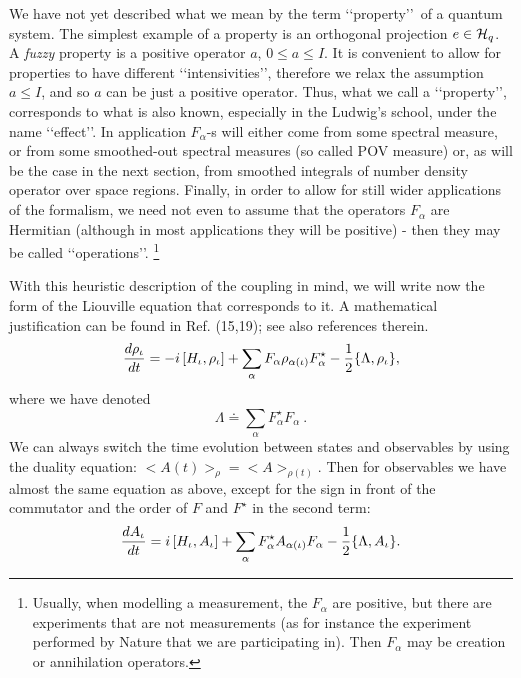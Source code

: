 \documentclass[12pt]{article}
\def\hq{{\cal H}_q}
\def\be{\begin{equation}}
\def\ee{\end{equation}}
\def\lqq{\lq\lq}
\def\rqq{\rq\rq}
\begin{document}
We have not yet described what we mean by the term \lqq property\rqq\,  of a
quantum system. The simplest example of a property is an orthogonal
projection $e\in\hq$. A {\sl fuzzy} property is a positive operator $a$,
$0\leq a \leq I$. It is convenient to allow for properties to have
different \lqq intensivities\rqq, therefore we relax the assumption
$a\leq I$,
and so
$a$ can be just a positive operator. Thus, what we call a \lqq property\rqq,
corresponds to what is also known, especially in the Ludwig's school,
under the name \lqq effect\rqq. In application $F_\alpha$-s will either
come
from some spectral measure, or from some smoothed-out spectral measures
(so called POV measure) or, as will be the case in the next section,
from smoothed integrals of number density operator over space regions.
Finally, in order to allow for still  wider applications of the formalism,
we need not even to assume that the operators $F_\alpha$ are Hermitian
(although in most applications they will be positive) - then they may
be called \lqq operations\rqq. \footnote{Usually, when modelling a
measurement, the $F_\alpha$ are positive, but there are experiments that
are not measurements (as for instance the experiment performed by
Nature that we are participating in). Then $F_\alpha$ may be creation
or annihilation operators.}

With this heuristic description of the coupling in mind, we will write
now the form of the Liouville equation that corresponds to it. A
mathematical justification can be found in Ref. (15,19); see also
references therein.
\be
{{d\rho_\iota}\over {dt}}=-i\left[H_\iota,\rho_\iota\right]+\sum_\alpha
F_\alpha\rho_{\alpha(\iota)}F_\alpha^{\star}-{1\over
2}\{\Lambda,\rho_\iota\},
\label{eq:rd}
\ee
where we have denoted
\be
\Lambda\doteq \sum_\alpha F_\alpha^{\star} F_\alpha\ .\ee
We can always switch the time evolution between states and observables
by using the duality equation: $<A(t)>_\rho=<A>_{\rho(t)}$. Then for
observables we have almost the same equation as above,
except for the sign in front of the commutator and the order of $F$ and
$F^\star$ in the second term:
\be
{{dA_\iota}\over {dt}}=i\left[H_\iota,A_\iota\right]+\sum_\alpha
F_\alpha^{\star} A_{\alpha(\iota)}F_\alpha-{1\over
2}\{\Lambda ,A_\iota\}.\label{eq:ad}
\ee
\end{document}
